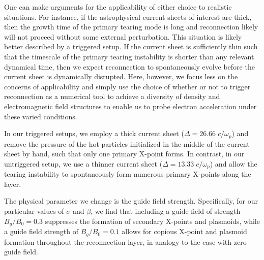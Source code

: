 One can make arguments for the applicability of either choice to realistic situations.  For instance, if the astrophysical current sheets of interest are thick, then the growth time of the primary tearing mode is long and reconnection likely will not proceed without some external perturbation.  This situation is likely better described by a triggered setup.  If the current sheet is sufficiently thin such that the timescale of the primary tearing instability is shorter than any relevant dynamical time, then we expect reconnection to spontaneously evolve before the current sheet is dynamically disrupted.   Here, however, we focus less on the concerns of applicability and simply use the choice of whether or not to trigger reconnection as a numerical tool to achieve a diversity of density and electromagnetic field structures to enable us to probe electron acceleration under these varied conditions.

In our triggered setups, we employ a thick current sheet ($\Delta=26.66 \; c/\omega_{p}$) and remove the pressure of the hot particles initialized in the middle of the current sheet by hand, such that only one primary X-point forms.  In contrast, in our untriggered setup, we use a thinner current sheet ($\Delta=13.33 \; c/\omega_{p}$) and allow the tearing instability to spontaneously form numerous primary X-points along the layer.

The physical parameter we change is the guide field strength.  Specifically, for our particular values of $\sigma$ and $\beta$, we find that including a guide field of strength $B_{g}/B_{0}=0.3$ suppresses the formation of secondary X-points and plasmoids, while a guide field strength of $B_{g}/B_{0}=0.1$ allows for copious X-point and plasmoid formation throughout the reconnection layer, in analogy to the case with zero guide field.  

